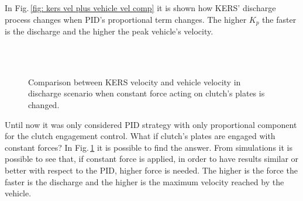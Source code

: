 \documentclass[11pt]{article}
\begin{document}
In Fig.\,\ref{fig: kers vel plus vehicle vel comp} it is shown how KERS' discharge process changes when PID's proportional term changes. The higher $K_p$ the faster is the discharge and the higher the peak vehicle's velocity.

\begin{figure}[H]
	\centering
	 \\
	 \\
	\caption{Comparison between KERS velocity \protect{} and vehicle velocity  \protect{} in discharge scenario when constant force acting on clutch's plates is changed.}
	\label{fig: kforcediscomp}
\end{figure}

Until now it was only considered PID strategy with only proportional component for the clutch engagement control. What if clutch's plates are engaged with constant forces? In Fig.\,\ref{fig: kforcediscomp} it is possible to find the answer. From simulations it is possible to see that, if constant force is applied, in order to have results similar or better with respect to the PID, higher force is needed. The higher is the force the faster is the discharge and the higher is the maximum velocity reached by the vehicle. 
\end{document}
